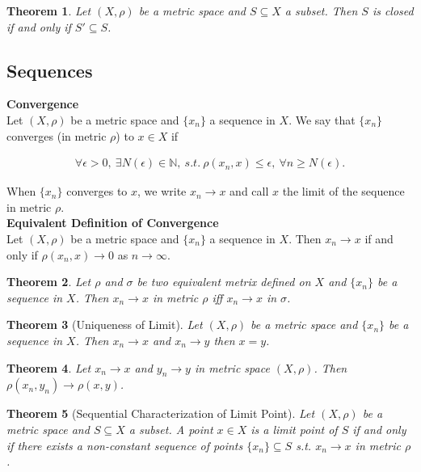 \documentclass{article}
\newtheorem{theorem}{Theorem}[section]
\numberwithin{theorem}{subsection}
\numberwithin{theorem}{subsubsection}
\theoremstyle{definition}
\numberwithin{definition}{subsection}
\numberwithin{definition}{subsubsection}
\begin{document}
\begin{theorem}
    Let $(X,\rho)$ be a metric space and $S \subseteq X$ a subset. Then $S$ is closed if and only if $S' \subseteq S$.
\end{theorem}

\subsection{Sequences} 
\noindent \textbf{Convergence}\\
\indent Let $(X,\rho)$ be a metric space and $\{x_{n}\}$ a sequence in $X$. We say that $\{x_{n}\}$ converges (in metric $\rho$) to $x \in X$ if 

\begin{gather*}
    \forall \epsilon > 0,\ \exists N(\epsilon) \in \mathbb{N},\ s.t.\ \rho(x_{n},x) \leq \epsilon,\ \forall n \geq N(\epsilon).
\end{gather*}

\noindent When $\{x_{n}\}$ converges to $x$, we write $x_{n} \rightarrow x$ and call $x$ the limit of the sequence in metric $\rho$.
\\

\noindent \textbf{Equivalent Definition of Convergence} \\
\indent Let $(X,\rho)$ be a metric space and $\{x_{n}\}$ a sequence in $X$. Then $x_{n} \rightarrow x$ if and only if $\rho(x_{n},x) \rightarrow 0$ as $n\rightarrow \infty$. 

\begin{theorem}
    Let $\rho$ and $\sigma$ be two equivalent metrix defined on $X$ and $\{x_{n}\}$ be a sequence in $X$. Then $x_{n} \rightarrow x$ in metric $\rho$ iff $x_{n} \rightarrow x$ in $\sigma$.
\end{theorem}

\begin{theorem}[Uniqueness of Limit]
    Let $(X,\rho)$ be a metric space and $\{x_{n}\}$ be a sequence in $X$. Then $x_{n} \rightarrow x$ and $x_{n} \rightarrow y$ then $x = y$.
\end{theorem}

\begin{theorem}
    Let $x_{n} \rightarrow x$ and $y_{n} \rightarrow y$ in metric space $(X,\rho)$. Then $\rho(x_{n},y_{n}) \rightarrow \rho(x,y)$.
\end{theorem}

\begin{theorem}[Sequential Characterization of Limit Point]
    Let $(X, \rho)$ be a metric space and $S \subseteq X$ a subset. A point $x \in X$ is a limit point of $S$ if and only if there exists a non-constant sequence of points $\{x_{n}\} \subseteq S$ s.t. $x_{n} \rightarrow x$ in metric $\rho$.
\end{theorem}
\end{document}
